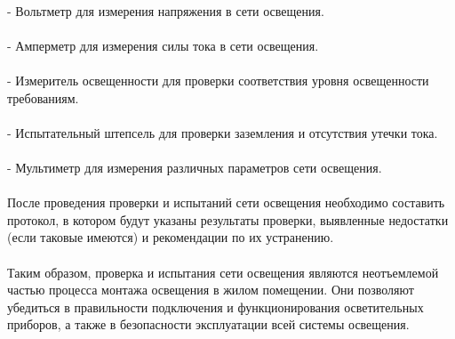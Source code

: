 \documentclass{article}
\begin{document}
~\\
- Вольтметр для измерения напряжения в сети освещения.\\
~\\
- Амперметр для измерения силы тока в сети освещения.\\
~\\
- Измеритель освещенности для проверки соответствия уровня освещенности требованиям.\\
~\\
- Испытательный штепсель для проверки заземления и отсутствия утечки тока.\\
~\\
- Мультиметр для измерения различных параметров сети освещения.\\
~\\
После проведения проверки и испытаний сети освещения необходимо составить протокол, в котором будут указаны результаты проверки, выявленные недостатки (если таковые имеются) и рекомендации по их устранению.\\
~\\
Таким образом, проверка и испытания сети освещения являются неотъемлемой частью процесса монтажа освещения в жилом помещении. Они позволяют убедиться в правильности подключения и функционирования осветительных приборов, а также в безопасности эксплуатации всей системы освещения.
\end{document}
